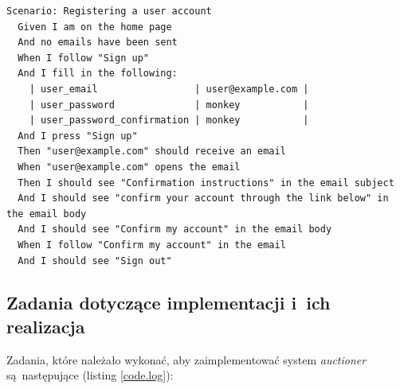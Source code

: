  \label{code.simpleruby}
\begin{lstlisting}[label={code.scenario}]
Scenario: Registering a user account
  Given I am on the home page
  And no emails have been sent
  When I follow "Sign up"
  And I fill in the following:
    | user_email                 | user@example.com |
    | user_password              | monkey           |
    | user_password_confirmation | monkey           |
  And I press "Sign up"
  Then "user@example.com" should receive an email
  When "user@example.com" opens the email
  Then I should see "Confirmation instructions" in the email subject
  And I should see "confirm your account through the link below" in the email body
  And I should see "Confirm my account" in the email body
  When I follow "Confirm my account" in the email
  And I should see "Sign out"
\end{lstlisting}

\newpage

\subsection{Zadania dotyczące implementacji i~ich realizacja}

Zadania, które należało wykonać, aby zaimplementować system \textit{auctioner} są~następujące (listing \ref{code.log}):

